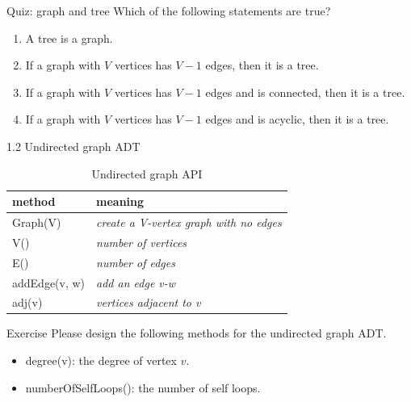 \documentclass[aspectratio=169, 14pt]{beamer}
\begin{document}
\begin{frame}{Quiz: graph and tree}
	Which of the following statements are true?

	\begin{enumerate}
		\item A tree is a graph.
		\item If a graph with $V$ vertices has $V-1$ edges, then it is a tree.
		\item If a graph with $V$ vertices has $V-1$ edges and is connected, then it is a tree.
		\item If a graph with $V$ vertices has $V-1$ edges and is acyclic, then it is a tree.
	\end{enumerate}
\end{frame}

\begin{frame}{1.2 Undirected graph ADT}
	\begin{table}
		\begin{tabular}{|l|l|}
			\hline
			method                & meaning                                        \\
			\hline
			\alert{Graph(V)}      & \textit{create a V-vertex graph with no edges} \\
			\alert{V()}           & \textit{number of vertices}                    \\
			\alert{E()}           & \textit{number of edges}                       \\
			\alert{addEdge(v, w)} & \textit{add an edge v-w}                       \\
			\alert{adj(v)}        & \textit{vertices adjacent to v}                \\
			\hline
		\end{tabular}
		\caption{Undirected graph API}
	\end{table}
\end{frame}

\begin{frame}{Exercise}
	Please design the following methods for the undirected graph ADT.

	\begin{itemize}
		\item \alert{degree(v)}: the degree of vertex $v$.
		\item \alert{numberOfSelfLoops()}: the number of self loops.
	\end{itemize}
\end{frame}
\end{document}
